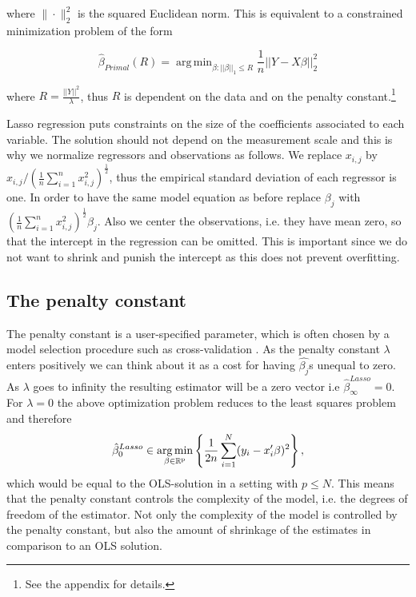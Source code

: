 \documentclass{article}
\theoremstyle{definition}
\DeclareMathOperator*{\argmin}{arg\,min}
\begin{document}
\noindent where $ \| \cdot \|_2^2 $ is the squared Euclidean norm. This is equivalent to a constrained minimization problem of the form 

\begin{equation}
\hat{\beta}_{Primal}(R)=\argmin_{\beta:||\beta||_1\leq R} \frac{1}{n}||Y-X\beta||_2^2 \label{Primal}
\end{equation} 

\noindent where $R = \frac{||Y||^2}{\lambda}$, thus $R$ is dependent on the data  and on the penalty constant.\footnote{See the appendix for details.}

Lasso regression puts constraints on the size of the coefficients associated to each variable. The solution should not depend on the measurement scale and this is why we normalize regressors and observations as follows. We replace $x_{i,j}$ by $x_{i,j}/ (\frac{1}{n} \sum_{i=1}^{n} x_{i,j}^2)^\frac{1}{2}$, thus the empirical standard deviation of each regressor is one. In order to have the same model equation as before replace $\beta_j$ with $(\frac{1}{n}\sum_{i=1}^{n} x_{i,j}^2)^\frac{1}{2} \beta_j$. Also we center the observations, i.e. they have mean zero, so that the intercept in the regression can be omitted. This is important since we do not want to shrink and punish the intercept as this does not prevent overfitting.

\subsection{The penalty constant}

The penalty constant is a user-specified parameter, which is often chosen by a model selection procedure such as cross-validation \citep{sparsity}.
As the penalty constant $\lambda$ enters positively we can think about it as a cost for having $\hat{\beta_j}$s unequal to zero. As $\lambda$ goes to infinity the resulting estimator will be a zero vector i.e $\hat{\beta}_{\infty}^{Lasso}=0$. For $\lambda=0$ the above optimization problem reduces to the least squares problem and therefore 
\begin{equation} \label{eq: lasso}
	\hat{\beta}_{0}^{Lasso}\in\argmin_{\beta \in\rm \mathbb{R}^p} \left  \{ \frac{1}{2n}  \sum_{i=1}^{N}(y_{i}-x_{i}'\beta)^2\right \},
\end{equation}
which would be equal to the OLS-solution in a setting with $p\leq N$. This means that the penalty constant controls the complexity of the model, i.e. the degrees of freedom of the estimator. Not only the complexity of the model is controlled by the penalty constant, but also the amount of shrinkage of the estimates in comparison to an OLS solution.
\end{document}
